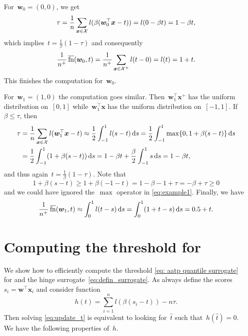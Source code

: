 For~$\bm{w}_0=(0,0)$, we get
\begin{equation*}
  \tau
  = \frac{1}{n}\sum_{\bm{x} \in \mathcal{X}}l(\beta(\bm{w}_0^\top \bm{x}-t))
  = l(0-\beta t) = 1-\beta t,
\end{equation*}
which implies~$t=\frac{1}{\beta}(1-\tau)$ and consequently
\begin{equation*}
  \frac{1}{n^+}\operatorname{\overline{fn}}(\bm{w}_0,t)
  = \frac{1}{n^+}\sum_{\bm{x} \in \mathcal{X}^+} l(t-0)
  = l(t) = 1+t.
\end{equation*}
This finishes the computation for~$\bm{w}_0$.

For~$\bm{w}_1=(1,0)$ the computation goes similar. Then~$\bm{w}_1^\top \bm{x}^+$ has the uniform distribution on~$[0,1]$ while~$\bm{w}_1^\top \bm{x}$ has the uniform distribution on~$[-1,1]$. If~$\beta\le\tau$, then
\begin{equation}\label{eq:example1}
  \begin{aligned}
    \tau
    & = \frac{1}{n}\sum_{\bm{x} \in \mathcal{X}}l(\bm{w}_1^\top \bm{x}-t)
    \approx \frac{1}{2}\int_{-1}^1 l(s-t)\mathop{}\!\mathrm{d}s
      = \frac{1}{2}\int_{-1}^1 \max\{0,1+\beta(s-t)\}\mathop{}\!\mathrm{d}s \\
    & =\frac{1}{2}\int_{-1}^1 (1+\beta(s - t))\mathop{}\!\mathrm{d}s
      = 1 - \beta t + \frac{\beta}{2}\int_{-1}^1s\mathop{}\!\mathrm{d}s
      = 1 - \beta t,
  \end{aligned}
\end{equation}
and thus again~$t=\frac{1}{\beta}(1-\tau)$. Note that
\begin{equation*}
  1+\beta(s-t) \ge 1+\beta(-1-t) = 1-\beta - 1+\tau = -\beta+\tau \ge0
\end{equation*}
and we could have ignored the~$\max$ operator in \eqref{eq:example1}. Finally, we have
\begin{equation*}
  \frac{1}{n^+}\operatorname{\overline{fn}}(\bm{w}_1,t)
  \approx \int_0^1 l(t-s)\mathop{}\!\mathrm{d}s
  = \int_0^1 (1 + t - s)\mathop{}\!\mathrm{d}s
  = 0.5 + t.
\end{equation*}

\section{Computing the threshold for \PatMat}\label{app:threshold}

We show how to efficiently compute the threshold \eqref{eq: aatp quantile surrogate} for \PatMat and the hinge surrogate~\eqref{eq:defin_surrogate}. As always define the scores~$s_i=\bm{w}^\top \bm{x}_i$ and consider function
\begin{equation}\label{eq:defin_h}
  h(t) = \sum_{i=1}^nl(\beta(s_i-t)) - n\tau.
\end{equation}
Then solving \eqref{eq:update_t} is equivalent to looking for~$\hat{t}$ such that~$h(\hat{t})=0$. We have the following properties of~$h$.

